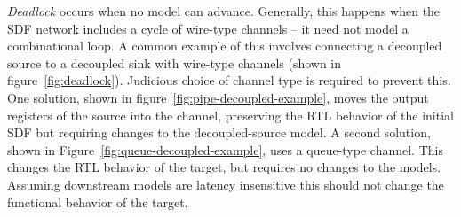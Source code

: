 \emph{Deadlock} occurs when no model can advance. Generally, this happens when
the SDF network includes a cycle of wire-type channels -- it need not model a
combinational loop.  A common example of this involves connecting a decoupled
source to a decoupled sink with wire-type channels (shown in
figure~\ref{fig:deadlock}). Judicious choice of channel type is required to
prevent this. One solution, shown in figure~\ref{fig:pipe-decoupled-example},
moves the output registers of the source into the channel, preserving the RTL
behavior of the initial SDF but requiring changes to the decoupled-source
model.  A second solution, shown in Figure~\ref{fig:queue-decoupled-example},
uses a queue-type channel. This changes the RTL behavior of the target, but
requires no changes to the models.  Assuming downstream models are latency
insensitive this should not change the functional behavior of the target.


